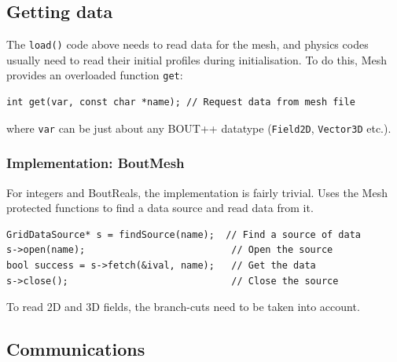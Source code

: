 \documentclass[12pt]{article}
\newcommand{\code}[1]{\texttt{#1}}
\begin{document}
\subsection{Getting data}

The \code{load()} code above needs to read data for the mesh, and physics
codes usually need to read their initial profiles during initialisation.
To do this, Mesh provides an overloaded function \code{get}:
\begin{lstlisting}
int get(var, const char *name); // Request data from mesh file
\end{lstlisting}
where \code{var} can be just about any BOUT++ datatype (\code{Field2D},
\code{Vector3D} etc.). 

\subsubsection{Implementation: BoutMesh}

For integers and BoutReals, the implementation is fairly trivial. Uses
the Mesh protected functions to find a data source and read data from it.
\begin{lstlisting}
GridDataSource* s = findSource(name);  // Find a source of data
s->open(name);                          // Open the source
bool success = s->fetch(&ival, name);   // Get the data
s->close();                             // Close the source
\end{lstlisting}

To read 2D and 3D fields, the branch-cuts need to be taken into account.

\subsection{Communications}
\end{document}
